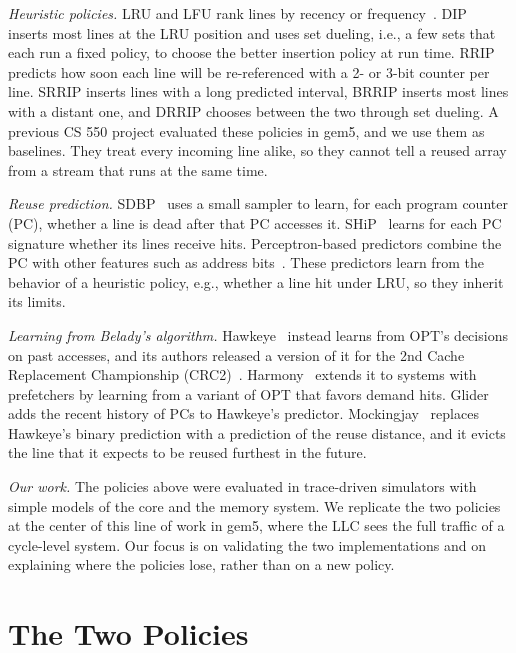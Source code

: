 \documentclass[11pt,conference]{IEEEtran}
\begin{document}
\emph{Heuristic policies.} LRU and LFU rank lines by recency or
frequency~\cite{hp6}. DIP~\cite{dip} inserts most lines at the LRU position and
uses set dueling, i.e., a few sets that each run a fixed policy, to choose the
better insertion policy at run time. RRIP~\cite{rrip} predicts how soon each
line will be re-referenced with a 2- or 3-bit counter per line. SRRIP inserts
lines with a long predicted interval, BRRIP inserts most lines with a distant
one, and DRRIP chooses between the two through set dueling. A previous CS 550
project evaluated these policies in gem5, and we use them as baselines. They
treat every incoming line alike, so they cannot tell a reused array from a
stream that runs at the same time.

\emph{Reuse prediction.} SDBP~\cite{sdbp} uses a small sampler to learn, for
each program counter (PC), whether a line is dead after that PC accesses it.
SHiP~\cite{ship} learns for each PC signature whether its lines receive hits. Perceptron-based predictors combine the PC with other features such as
address bits~\cite{perceptron}. These predictors learn from the behavior of a
heuristic policy, e.g., whether a line hit under LRU, so they inherit its
limits.

\emph{Learning from Belady's algorithm.} Hawkeye~\cite{hawkeye} instead learns
from OPT's decisions on past accesses, and its authors released a version of
it for the 2nd Cache Replacement Championship (CRC2)~\cite{crc2}. Harmony~\cite{harmony} extends it to systems
with prefetchers by learning from a variant of OPT that favors demand hits.
Glider~\cite{glider} adds the recent history of PCs to Hawkeye's predictor.
Mockingjay~\cite{mockingjay} replaces Hawkeye's binary prediction with a
prediction of the reuse distance, and it evicts the line that it expects to be
reused furthest in the future.

\emph{Our work.} The policies above were evaluated in trace-driven simulators
with simple models of the core and the memory system. We replicate the two
policies at the center of this line of work in gem5, where the LLC sees the
full traffic of a cycle-level system. Our focus is on validating the two
implementations and on explaining where the policies lose, rather than on a
new policy.

\section{The Two Policies}
\label{sec:policies}
\end{document}

